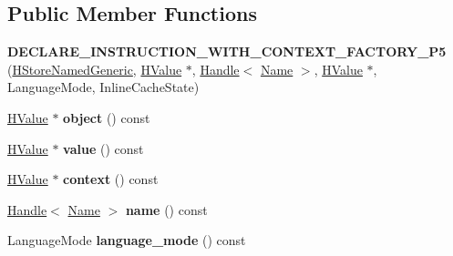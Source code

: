 \subsection*{Public Member Functions}
\begin{DoxyCompactItemize}
\item 
{\bfseries D\+E\+C\+L\+A\+R\+E\+\_\+\+I\+N\+S\+T\+R\+U\+C\+T\+I\+O\+N\+\_\+\+W\+I\+T\+H\+\_\+\+C\+O\+N\+T\+E\+X\+T\+\_\+\+F\+A\+C\+T\+O\+R\+Y\+\_\+\+P5} (\hyperlink{classv8_1_1internal_1_1_h_store_named_generic}{H\+Store\+Named\+Generic}, \hyperlink{classv8_1_1internal_1_1_h_value}{H\+Value} $\ast$, \hyperlink{classv8_1_1internal_1_1_handle}{Handle}$<$ \hyperlink{classv8_1_1internal_1_1_name}{Name} $>$, \hyperlink{classv8_1_1internal_1_1_h_value}{H\+Value} $\ast$, Language\+Mode, Inline\+Cache\+State)\hypertarget{classv8_1_1internal_1_1_h_store_named_generic_aff0d7e794056b9a921f6442ddcc10902}{}\label{classv8_1_1internal_1_1_h_store_named_generic_aff0d7e794056b9a921f6442ddcc10902}

\item 
\hyperlink{classv8_1_1internal_1_1_h_value}{H\+Value} $\ast$ {\bfseries object} () const \hypertarget{classv8_1_1internal_1_1_h_store_named_generic_ab66ea23e3416df13dbf7a669d6edcc04}{}\label{classv8_1_1internal_1_1_h_store_named_generic_ab66ea23e3416df13dbf7a669d6edcc04}

\item 
\hyperlink{classv8_1_1internal_1_1_h_value}{H\+Value} $\ast$ {\bfseries value} () const \hypertarget{classv8_1_1internal_1_1_h_store_named_generic_a0c1204d917af569cf3656a7bb79bc508}{}\label{classv8_1_1internal_1_1_h_store_named_generic_a0c1204d917af569cf3656a7bb79bc508}

\item 
\hyperlink{classv8_1_1internal_1_1_h_value}{H\+Value} $\ast$ {\bfseries context} () const \hypertarget{classv8_1_1internal_1_1_h_store_named_generic_a13a1c1cf8b3e9d0cb9c58633c71cd890}{}\label{classv8_1_1internal_1_1_h_store_named_generic_a13a1c1cf8b3e9d0cb9c58633c71cd890}

\item 
\hyperlink{classv8_1_1internal_1_1_handle}{Handle}$<$ \hyperlink{classv8_1_1internal_1_1_name}{Name} $>$ {\bfseries name} () const \hypertarget{classv8_1_1internal_1_1_h_store_named_generic_aa2238a2a2d0e65ced52d6a90f3e94a24}{}\label{classv8_1_1internal_1_1_h_store_named_generic_aa2238a2a2d0e65ced52d6a90f3e94a24}

\item 
Language\+Mode {\bfseries language\+\_\+mode} () const \hypertarget{classv8_1_1internal_1_1_h_store_named_generic_aa783dcdbe906038f59885889e2822d19}{}\label{classv8_1_1internal_1_1_h_store_named_generic_aa783dcdbe906038f59885889e2822d19}


\end{DoxyCompactItemize}
